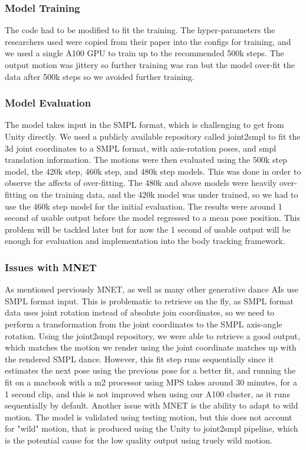 \documentclass[final,5p,times,authoryear]{article}
\begin{document}
\subsubsection{Model Training}

The code had to be modified to fit the training. The hyper-parameters the
researchers used were copied from their paper into the configs for training, and
we used a single A100 GPU to train up to the recommended 500k steps. The output
motion was jittery so further training was ran but the model over-fit the data
after 500k steps so we avoided further training.


\subsubsection{Model Evaluation}
The model takes input in the SMPL format, which is challenging to get from Unity
directly. We used a publicly available repository called joint2smpl to fit the
3d joint coordinates to a SMPL format, with axis-rotation poses, and smpl
translation information. The motions were then evaluated using the 500k step
model, the 420k step, 460k step, and 480k step models. This was done in order to observe the
affects of over-fitting. The 480k and above models were heavily over-fitting on
the training data, and the 420k model was under trained, so we had to use the
460k step model for the initial evaluation. The results were around 1 second of
usable output before the model regressed to a mean pose position. This problem
will be tackled later but for now the 1 second of usable output will be enough
for evaluation and implementation into the body tracking framework.

\subsubsection{Issues with MNET}
As mentioned perviously MNET, as well as many other generative dance AIs use
SMPL format input. This is problematic to retrieve on the fly, as SMPL format
data uses joint rotation instead of absolute join coordinates, so we need to
perform a transformation from the joint coordinates to the SMPL axis-angle
rotation. Using the joint2smpl repository, we were able to retrieve a good
output, which matches the motion we render using the joint coordinate matches up
with the rendered SMPL dance. However, this fit step runs sequentially since it
estimates the next pose using the previous pose for a better fit, and running
the fit on a macbook with a m2 processor using MPS takes around 30 minutes, for
a 1 second clip, and this is not improved when using our A100 cluster, as it
runs sequentially by default. Another issue with MNET is the ability to adapt to
wild motion. The model is validated using testing motion, but this does not
account for "wild" motion, that is produced using the Unity to joint2smpl
pipeline, which is the potential cause for the low quality output using truely
wild motion.
\end{document}
